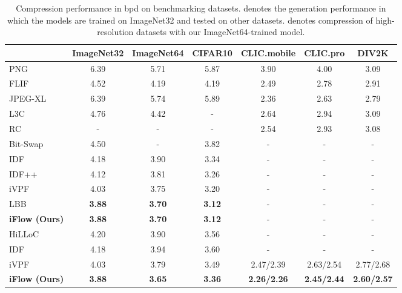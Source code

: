 \documentclass{article}
\begin{document}
\begin{table}[t]
\centering
\small
\caption{Compression performance in bpd on benchmarking datasets.  denotes the generation performance in which the models are trained on ImageNet32 and tested on other datasets.  denotes compression of high-resolution datasets with our ImageNet64-trained model.}
\label{tab:small}
\begin{tabular}{lccc|ccc}
\toprule
         & ImageNet32 & ImageNet64 & CIFAR10 & CLIC.mobile & CLIC.pro &DIV2K \\
\midrule
PNG \cite{boutell1997png}     & 6.39        & 5.71        & 5.87 &3.90 & 4.00 & 3.09 \\
FLIF \cite{sneyers2016flif}    & 4.52        & 4.19        & 4.19&2.49 & 2.78 & 2.91 \\
JPEG-XL \cite{alakuijala2019jpeg} & 6.39 & 5.74 & 5.89 &2.36 & 2.63 & 2.79 \\
\midrule
L3C \cite{mentzer2019practical}      & 4.76        & 4.42           & - &2.64 & 2.94 & 3.09 \\
RC \cite{mentzer2020learning}  &-&-&-   & 2.54 & 2.93 & 3.08 \\
Bit-Swap \cite{kingma2019bit} & 4.50        & -           & 3.82 &-&-&-\\
\midrule
IDF \cite{hoogeboom2019integer}     & 4.18        & 3.90        & 3.34 &-&-&-\\
IDF++ \cite{berg2020idf++}   & 4.12        & 3.81        & 3.26 &-&-&-\\
iVPF \cite{zhang2021ivpf}     & 4.03        & 3.75     & 3.20 & - & - & - \\
LBB \cite{ho2019compression}      & \textbf{3.88}        & \textbf{3.70}        & \textbf{3.12} &-&-&-\\
\textbf{iFlow (Ours)}      & \textbf{3.88}  & \textbf{3.70} & \textbf{3.12}  & - & - & -\\
\midrule
HiLLoC \cite{townsend2019hilloc}  & 4.20        & 3.90        & 3.56 &-&-&-\\
IDF \cite{hoogeboom2019integer}     & 4.18        & 3.94        & 3.60 &-&-&-\\
iVPF \cite{zhang2021ivpf}     & 4.03        & 3.79     & 3.49 & 2.47/2.39 & 2.63/2.54 & 2.77/2.68 \\
\textbf{iFlow (Ours)}     & \textbf{3.88}  & \textbf{3.65}  & \textbf{3.36} &\textbf{2.26/2.26} & \textbf{2.45/2.44} & \textbf{2.60/2.57} \\
\bottomrule
\end{tabular}
\end{table}
\end{document}
